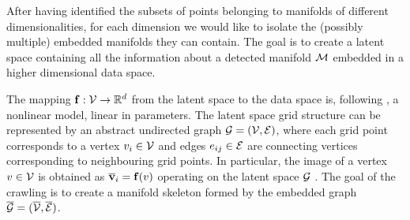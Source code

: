
After having identified the subsets of points belonging to manifolds of different dimensionalities, for each dimension we would like to isolate the (possibly multiple) embedded manifolds they can contain.
The goal is to create a latent space containing all the information about a detected manifold $\mathcal{M}$ embedded in a higher dimensional data space.

The mapping $\boldsymbol{\mathbf{f}}: \mathcal{V} \to \mathbb{R}^d$ from the latent space to the data space is, following \citet{Bishop1998GTMTG},
a nonlinear model, linear in parameters.
The latent space grid structure can be represented by an abstract undirected graph $\mathcal{G} = (\mathcal{V},\mathcal{E})$, where each grid point corresponds to a vertex $v_i \in \mathcal{V}$ and edges $e_{ij} \in \mathcal{E}$ are connecting vertices corresponding to neighbouring grid points.
In particular, the image of a vertex $v \in \mathcal{V}$ %
is obtained as $\overline{\boldsymbol{\mathbf{v}}}_i = \boldsymbol{\mathbf{f}}(v)$ operating on the latent space $\mathcal{G}$ \citep[see section 3.1 of][for details]{Canducci2021}.
The goal of the crawling is to create a manifold skeleton formed by the embedded graph
$\overline{\mathcal{G}} = (\overline{\mathcal{V}},\overline{\mathcal{E}})$.%

